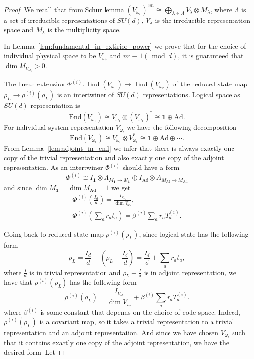 \documentclass[11pt,letterpaper]{article}
\theoremstyle{plain}
\theoremstyle{plain}
\theoremstyle{plain}
\theoremstyle{plain}
\theoremstyle{plain}
\theoremstyle{plain}
\theoremstyle{plain}
\theoremstyle{definition}
\theoremstyle{plain}
\begin{document}
\begin{proof}
We recall that from Schur lemma $\left(V_{\omega_r}\right)^{\otimes n}\cong \bigoplus_{\lambda\in \Lambda} V_\lambda\otimes M_{\lambda}$, 
where $\Lambda$ is a set of irreducible representations of $SU(d)$, 
$V_\lambda$ is the irreducible representation space and $M_\lambda$ is the multiplicity space.

In Lemma~\ref{lem:fundamental_in_extirior_power} we prove that for the choice of individual physical space to be $V_{\omega_r}$ and $n r \equiv 1 (\bmod d)$, it is guaranteed 
that $\operatorname{dim} M_{V_{\omega_1}}>0$.

The linear extension $\Phi^{(i)}:\operatorname{End}(V_{\omega_1})\rightarrow \operatorname{End}(V_{\omega_r})$ of the reduced state map $\rho_L \rightarrow \rho^{(i)}\left(\rho_L\right)$ is an intertwiner of $SU(d)$ representations. 
Logical space as $SU(d)$ representation is
\[
     \text{End}(V_{\omega_1})\cong V_{\omega_1} \otimes (V_{\omega_1})^* \cong \mathbf{1} \oplus \mathrm{Ad}.
\]
For individual system representation $V_{\omega_r}$ we have the following decomposition
\[
    \text{End}(V_{\omega_r})\cong V_{\omega_r} \otimes V_{\omega_r}^* \cong \mathbf{1} \oplus \mathrm{Ad} \oplus \cdots.
\]
From Lemma~\ref{lem:adjoint_in_end} we infer that there is always exactly one copy of the trivial representation and also exactly one copy of the adjoint representation.
As an intertwiner $\Phi^{(i)}$ should have a form
\[
\Phi^{(i)}\cong I_{\mathbf{1}}\otimes A_{M_\mathbf{1}\rightarrow M_\mathbf{1}}\oplus I_{\mathrm{Ad}}\otimes A_{M_\mathrm{Ad}\rightarrow M_\mathrm{Ad}}
\]
and since $\dim M_\mathbf{1}=\dim M_\mathrm{Ad}=1$ we get
\begin{equation}
\begin{gathered}
        \Phi^{(i)}\left(\frac{I_d}{d}\right)=\frac{I_{V_{\omega_r}}}{\operatorname{dim} V_{\omega_r}},\\
        \Phi^{(i)}\left(\sum_a r_a t_a\right)=\beta^{(i)}\sum_a r_a T_a^{(i)}.
\end{gathered}
\end{equation}

Going back to reduced state map $\rho^{(i)}\left(\rho_L\right)$, since logical state has the following form
\[
     \rho_L=\frac{I_d}{d}+\left(\rho_L-\frac{I_d}{d}\right)=\frac{I_d}{d}+\sum_a r_a t_a,
\]
where $\frac{I}{d}$ is in trivial representation and $\rho_L-\frac{I}{d}$ is in adjoint representation, we have that $\rho^{(i)}\left(\rho_L\right)$ has the following form
\[
    \rho^{(i)}\left(\rho_L\right) = \frac{I_{V_{\omega_r}}}{\operatorname{dim} V_{\omega_r}}+\beta^{(i)} \sum_a r_a T_a^{(i)}.
\]
where $\beta^{(i)}$ is some constant that depends on the choice of code space.
Indeed, $\rho^{(i)}\left(\rho_L\right)$ is a covariant map, so it takes a trivial representation to a trivial representation and an adjoint representation.
And since we have chosen $V_{\omega_r}$ such that it contains exactly one copy of the adjoint representation, we have the desired form. Let


\end{proof}
\end{document}
